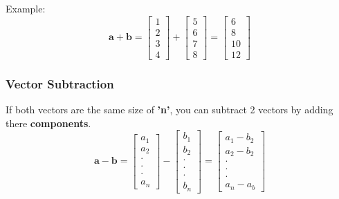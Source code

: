\documentclass[12pt]{article}
\begin{document}
            Example:
            \begin{equation}
                \mathbf{a + b} =
                    \begin{bmatrix} 1 \\ 2 \\ 3 \\ 4 \end{bmatrix} +
                    \begin{bmatrix} 5 \\ 6 \\ 7 \\ 8 \end{bmatrix} =
                    \begin{bmatrix} 6 \\ 8 \\ 10 \\ 12 \end{bmatrix}
            \end{equation}

        \subsubsection{Vector Subtraction}
            If both vectors are the same size of \textbf{'n'}, you can subtract 2 vectors by adding there \textbf{components}.
            \begin{equation}
                \mathbf{a - b} =
                    \begin{bmatrix} a_1 \\ a_2 \\ \cdot \\ \cdot \\ \cdot \\ a_n \end{bmatrix} -
                    \begin{bmatrix} b_1 \\ b_2 \\ \cdot \\ \cdot \\ \cdot \\ b_n \end{bmatrix} =
                    \begin{bmatrix} a_1 - b_2 \\ a_2 - b_2 \\ \cdot \\ \cdot \\ \cdot \\ a_n - a_b \end{bmatrix}
            \end{equation}
\end{document}
